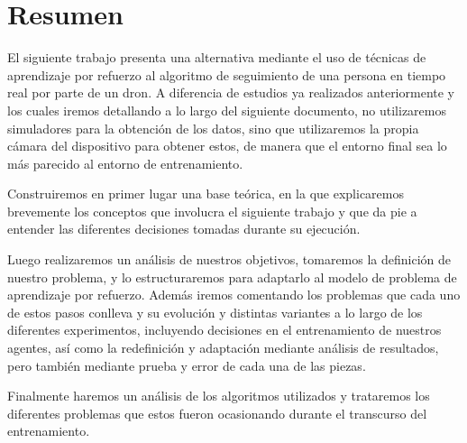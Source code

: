 \cleardoublepage

\chapter*{Resumen}
\label{resumen}

El siguiente trabajo presenta una alternativa mediante el uso de técnicas de aprendizaje por refuerzo al algoritmo de seguimiento de una persona en tiempo real por parte de un dron. A diferencia de estudios ya realizados anteriormente y los cuales iremos detallando a lo largo del siguiente documento, no utilizaremos simuladores para la obtención de los datos, sino que utilizaremos la propia cámara del dispositivo para obtener estos, de manera que el entorno final sea lo más parecido al entorno de entrenamiento.
\medskip

Construiremos en primer lugar una base teórica, en la que explicaremos brevemente los conceptos que involucra el siguiente trabajo y que da pie a entender las diferentes decisiones tomadas durante su ejecución.
\medskip

Luego realizaremos un análisis de nuestros objetivos, tomaremos la definición de nuestro problema, y lo estructuraremos para adaptarlo al modelo de problema de aprendizaje por refuerzo. Además iremos comentando los problemas que cada uno de estos pasos conlleva y su evolución y distintas variantes a lo largo de los diferentes experimentos, incluyendo decisiones en el entrenamiento de nuestros agentes, así como la redefinición y adaptación mediante análisis de resultados, pero también mediante prueba y error de cada una de las piezas.
\medskip

Finalmente haremos un análisis de los algoritmos utilizados y trataremos los diferentes problemas que estos fueron ocasionando durante el transcurso del entrenamiento. 

